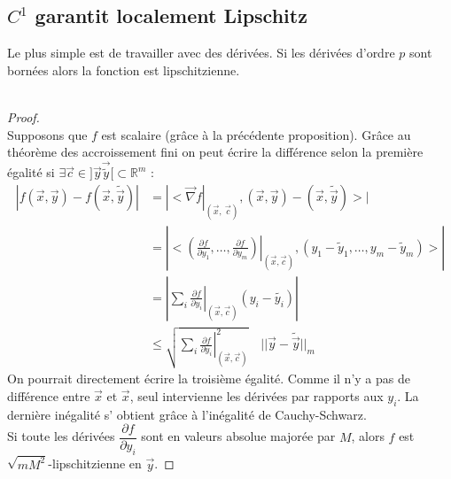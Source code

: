 	\subsection{$C^1$ garantit localement Lipschitz}
	Le plus simple est de travailler avec des dérivées. Si les dérivées d'ordre 
	$p$ sont bornées alors la fonction est lipschitzienne.\\
	\ 		
		\begin{proof}\ \\
		Supposons que $f$ est scalaire (grâce à la précédente proposition). Grâce au 
		théorème des accroissement fini on peut écrire la différence selon la première 
		égalité si $\exists \vec{c} \in ]\vec{y}\vec{\tilde{y}}[\subset \mathbb{R}^m$ :		
\begin{equation}
\begin{array}{ll}
| f (\vec x , \vec y ) - f ( \vec x , \tilde{\vec y} ) | & =
{\displaystyle \left | < \vec {\nabla} f  \right |_{( \vec x , \
\vec c)} , (\vec x , \vec y ) -  ( \vec x , \tilde{\vec y} ) > | }\\

  & = {\displaystyle | \left . \left . < \left (  \frac{\partial f}
{\partial y_1}, \ldots , \frac{\partial f}{\partial y_m} \right )
\right |_{( \vec x , \vec c)} ,  ( y_1 - \tilde{y}_1, \ldots, y_m -
 \tilde{y}_m ) > \right . | }\\

 & ={\displaystyle | \left . \left . \sum_i \frac{\partial f}
{\partial y_i} \right |_{( \vec x , \vec c)} ( y_i - \tilde{y_i} )
\right .  | }\\

  &{\displaystyle \leq \sqrt{\sum_i \left . \frac{\partial f }
{\partial y_i} \right | ^2 _{(\vec x , \vec c )}} \quad  || \vec y -
\tilde{\vec y} ||_m }
\end{array}
\end{equation}
	On pourrait directement écrire la 
	troisième égalité. Comme il n'y a pas de différence entre $\vec{x}$ et $\vec{x}$, 
	seul intervienne les dérivées par rapports aux $y_i$. La dernière inégalité s'
	obtient gr\^ace à l'inégalité de Cauchy-Schwarz.\\
	Si toute les dérivées $\dfrac{\partial f}{\partial y_i}$ sont en valeurs absolue 
	majorée par $M$, alors $f$ est $\sqrt{mM^2}$-lipschitzienne en $\vec{y}$.
		\end{proof}
		
